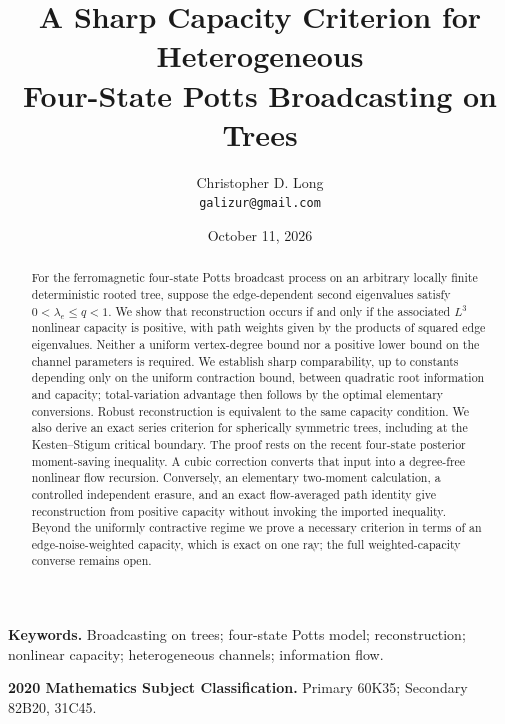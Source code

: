 \documentclass[11pt]{article}
\title{A Sharp Capacity Criterion for Heterogeneous\\Four-State Potts Broadcasting on Trees}
\author{Christopher D. Long\\\texttt{galizur@gmail.com}}
\date{October 11, 2026}
\theoremstyle{remark}
\numberwithin{equation}{section}
\begin{document}
\maketitle

\begin{abstract}
For the ferromagnetic four-state Potts broadcast process on an arbitrary
locally finite deterministic rooted tree, suppose the edge-dependent
second eigenvalues satisfy $0<\lambda_e\le q<1$. We show that
reconstruction occurs if and only if the associated $L^3$ nonlinear
capacity is positive, with path weights given by the products of squared
edge eigenvalues. Neither a uniform vertex-degree bound nor a positive
lower bound on the channel parameters is required. We establish sharp
comparability, up to constants depending only on the uniform contraction
bound, between quadratic root information and capacity; total-variation
advantage then follows by the optimal elementary conversions. Robust
reconstruction is equivalent to the same capacity condition. We also derive
an exact series criterion for spherically symmetric trees, including at the
Kesten--Stigum critical boundary. The proof rests on the
recent four-state posterior moment-saving inequality. A
cubic correction converts that input into a degree-free nonlinear flow
recursion. Conversely, an elementary two-moment calculation, a controlled
independent erasure, and an exact flow-averaged path identity give
reconstruction from positive capacity without invoking the imported
inequality. Beyond the uniformly contractive regime we prove a necessary
criterion in terms of an edge-noise-weighted capacity, which is exact on one
ray; the full weighted-capacity converse remains open.
\end{abstract}

\noindent\textbf{Keywords.} Broadcasting on trees; four-state Potts model;
reconstruction; nonlinear capacity; heterogeneous channels; information flow.

\medskip
\noindent\textbf{2020 Mathematics Subject Classification.}
Primary 60K35; Secondary 82B20, 31C45.








\end{document}
